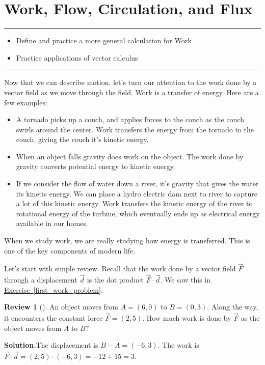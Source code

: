 \documentclass[10pt,]{book}
\theoremstyle{plain}
\theoremstyle{definition}
\theoremstyle{definition}
\theoremstyle{definition}
\newtheorem{project}{Review}[section]
\theoremstyle{definition}
\newenvironment{objectives}[1]{\noindent\rule{\linewidth}{0.1ex}\newline{\textbf{{\large#1}}\par\smallskip}}{\par\noindent\rule{\linewidth}{0.1ex}\par\smallskip}
\theoremstyle{definition}
\numberwithin{equation}{section}
\begin{document}
\section[{Work, Flow, Circulation, and Flux}]{Work, Flow, Circulation, and Flux}\label{ch09_01_workflux1}
\begin{objectives}{Objectives}\label{objectives-22}
%
\begin{itemize}[label=\textbullet]
\item{}Define and practice a more general calculation for Work%
\item{}Practice applications of vector calculus%
\end{itemize}
\end{objectives}
Now that we can describe motion, let's turn our attention to the work done by a vector field as we move through the field. Work is a transfer of energy. Here are a few examples: \leavevmode%
\begin{itemize}[label=\textbullet]
\item{}A tornado picks up a couch, and applies forces to the couch as the couch swirls around the center. Work transfers the energy from the tornado to the couch, giving the couch it's kinetic energy.%
\item{}When an object falls gravity does work on the object. The work done by gravity converts potential energy to kinetic energy.%
\item{}If we consider the flow of water down a river, it's gravity that gives the water its kinetic energy. We can place a hydro electric dam next to river to capture a lot of this kinetic energy.  Work transfers the kinetic energy of the river to rotational energy of the turbine, which eventually ends up as electrical energy available in our homes.%
\end{itemize}
%
\par
When we study work, we are really studying how energy is transferred. This is one of the key components of modern life.%
\par
Let's start with simple review. Recall that the work done by a vector field \(\vec F\) through a displacement \(\vec d\) is the dot product \(\vec F\cdot \vec d\). We saw this in \hyperref[first_work_problem]{Exercise~\ref{first_work_problem}}.%
\begin{project}[]\label{project-18}
An object moves from \(A=(6,0)\) to \(B=(0,3)\). Along the way, it encounters the constant force \(\vec F = (2,5)\). How much work is done by \(\vec F\) as the object moves from \(A\) to \(B\)?%
\par\medskip\noindent%
\textbf{Solution.}\quad The displacement is \(B-A=(-6,3)\). The work is \(\vec F\cdot \vec d = (2,5)\cdot(-6,3) = -12+15=3\).%
\end{project}
\end{document}
